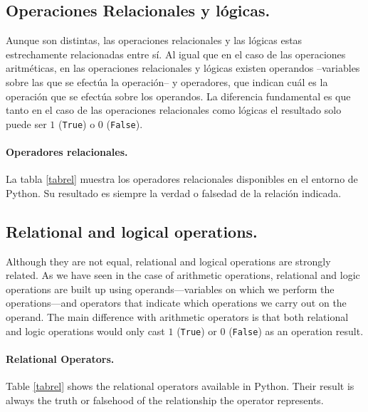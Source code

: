 \begin{paracol}{2}
\subsection{Operaciones Relacionales y lógicas.}
Aunque son distintas, las operaciones relacionales y las lógicas estas estrechamente relacionadas entre sí. Al igual que en el caso de las operaciones aritméticas, en las operaciones relacionales y lógicas existen operandos --variables sobre las que se efectúa la operación-- y operadores, que indican cuál es la operación que se efectúa sobre los operandos. La diferencia fundamental es que tanto en el caso de las operaciones relacionales como lógicas el resultado solo puede ser $1$ (\texttt{True}) o $0$ (\texttt{False}). 

\paragraph{Operadores relacionales.}La tabla \ref{tabrel} muestra los operadores relacionales disponibles en el entorno de Python. Su resultado es siempre la verdad o falsedad de la relación indicada. 
\switchcolumn
\subsection{Relational and logical operations.}
Although they are not equal, relational and logical operations are strongly related. As we have seen in the case of arithmetic operations, relational and logic operations are built up using operands—variables on which we perform the operations—and operators that indicate which operations we carry out on the operand.  The main difference with arithmetic operators is that both relational and logic operations would only cast $1$ (\texttt{True}) or $0$ (\texttt{False}) as an operation result.  

\paragraph{Relational Operators.} Table \ref{tabrel} shows the relational operators available in Python. Their result is always the truth or falsehood of the relationship the operator represents.
\end{paracol}


